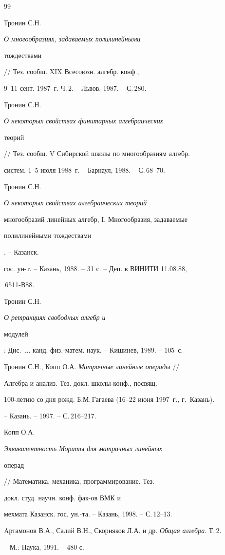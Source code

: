 \begin{thebibliography}{99}


Тронин С.Н. {\em О многообразиях, задаваемых полилинейными


тождествами} // Тез. сообщ. XIX Всесоюзн. алгебр. конф.,


9--11 сент. 1987~г. Ч.\,2. -- Львов, 1987. -- С.\,280.




Тронин С.Н. {\em О некоторых свойствах финитарных алгебраических


теорий} // Тез. сообщ. V Сибирской школы по многообразиям алгебр.


систем, 1--5 июля 1988~г. -- Барнаул, 1988. -- С.\,68--70.




Тронин С.Н. {\em О некоторых свойствах алгебраических теорий


многообразий линейных алгебр, $\mathrm I$. Многообразия, задаваемые


полилинейными тождествами}. -- Казанск.


гос. ун-т. -- Казань, 1988. -- 31 с. -- Деп. в ВИНИТИ 11.08.88,


\No\,6511-В88.




Тронин С.Н. {\em О ретракциях свободных алгебр и


модулей}: Дис.~$\dotsc$ канд. физ.-матем. наук. -- Кишинев, 1989. -- 105~с.




Тронин С.Н., Копп О.А. {\em Матричные линейные операды} //


Алгебра и анализ. Тез. докл. школы-конф., посвящ.


100-летию со дня рожд. Б.М.\,Гагаева (16--22 июня 1997~г., г.~Казань).


-- Казань. -- 1997. -- С.\,216--217.




Копп О.А. {\em Эквивалентность Мориты для матричных линейных


операд} // Математика, механика, программирование. Тез.


докл. студ. научн. конф. фак-ов ВМК и


мехмата Казанск. гос. ун.-та. -- Казань, 1998. -- С.\,12--13.




Aртамонов В.А., Салий В.Н., Скорняков Л.А. и др.  {\em Общая алгебра}. Т.\,2.


-- М.: Hаука, 1991. -- 480 с.



\end{thebibliography}
